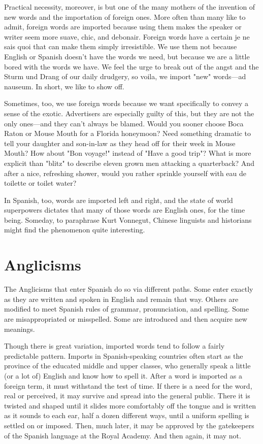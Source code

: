 Practical necessity, moreover, is but one of the many mothers
of the invention of new words and the importation of foreign ones.
More often than many like to admit, foreign words are imported because using them makes the speaker or writer seem more suave, chic,
and debonair. Foreign words have a certain je ne sais quoi that can
make them simply irresistible. We use them not because English or
Spanish doesn't have the words we need, but because we are a little
bored with the words we have. We feel the urge to break out of the
angst and the Sturm und Drang of our daily drudgery, so voila, we import "new" words---ad nauseum. In short, we like to show off.

Sometimes, too, we use foreign words because we want specifically to convey a sense of the exotic. Advertisers are especially
guilty of this, but they are not the only ones---and they can't always
be blamed. Would you sooner choose Boca Raton or Mouse Mouth for
a Florida honeymoon? Need something dramatic to tell your daughter
and son-in-law as they head off for their week in Mouse Mouth? How
about "Bon voyage!" instead of "Have a good trip"? What is more explicit than "blitz" to describe eleven grown men attacking a quarterback? And after a nice, refreshing shower, would you rather sprinkle
yourself with eau de toilette or toilet water?

In Spanish, too, words are imported left and right, and the
state of world superpowers dictates that many of those words are English ones, for the time being. Someday, to paraphrase Kurt Vonnegut,
Chinese linguists and historians might find the phenomenon quite
interesting.

\section{Anglicisms}

The Anglicisms that enter Spanish do so via different paths.
Some enter exactly as they are written and spoken in English and remain that way. Others are modified to meet Spanish rules of grammar,
pronunciation, and spelling. Some are misappropriated or misspelled.
Some are introduced and then acquire new meanings.

Though there is great variation, imported words tend to follow
a fairly predictable pattern. Imports in Spanish-speaking countries often start as the province of the educated middle and upper classes, who
generally speak a little (or a lot of) English and know how to spell it.
After a word is imported as a foreign term, it must withstand the test
of time. If there is a need for the word, real or perceived, it may survive
and spread into the general public. There it is twisted and shaped until
it slides more comfortably off the tongue and is written as it sounds to
each ear, half a dozen different ways, until a uniform spelling is settled
on or imposed. Then, much later, it may be approved by the gatekeepers of the Spanish language at the Royal Academy. And then again, it
may not.

